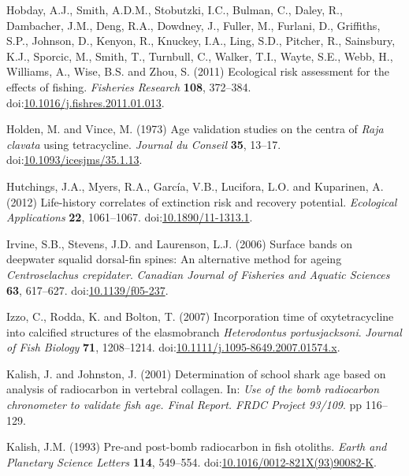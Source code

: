 \documentclass[]{article}
\begin{document}
\hypertarget{ref-hobday_ecological_2011}{}
Hobday, A.J., Smith, A.D.M., Stobutzki, I.C., Bulman, C., Daley, R.,
Dambacher, J.M., Deng, R.A., Dowdney, J., Fuller, M., Furlani, D.,
Griffiths, S.P., Johnson, D., Kenyon, R., Knuckey, I.A., Ling, S.D.,
Pitcher, R., Sainsbury, K.J., Sporcic, M., Smith, T., Turnbull, C.,
Walker, T.I., Wayte, S.E., Webb, H., Williams, A., Wise, B.S. and Zhou,
S. (2011) Ecological risk assessment for the effects of fishing.
\emph{Fisheries Research} \textbf{108}, 372--384.
doi:\href{https://doi.org/10.1016/j.fishres.2011.01.013}{10.1016/j.fishres.2011.01.013}.

\hypertarget{ref-holden_age_1973}{}
Holden, M. and Vince, M. (1973) Age validation studies on the centra of
\emph{Raja clavata} using tetracycline. \emph{Journal du Conseil}
\textbf{35}, 13--17.
doi:\href{https://doi.org/10.1093/icesjms/35.1.13}{10.1093/icesjms/35.1.13}.

\hypertarget{ref-hutchings_life-history_2012}{}
Hutchings, J.A., Myers, R.A., García, V.B., Lucifora, L.O. and
Kuparinen, A. (2012) Life-history correlates of extinction risk and
recovery potential. \emph{Ecological Applications} \textbf{22},
1061--1067.
doi:\href{https://doi.org/10.1890/11-1313.1}{10.1890/11-1313.1}.

\hypertarget{ref-irvine_surface_2006}{}
Irvine, S.B., Stevens, J.D. and Laurenson, L.J. (2006) Surface bands on
deepwater squalid dorsal-fin spines: An alternative method for ageing
\emph{Centroselachus crepidater}. \emph{Canadian Journal of Fisheries
and Aquatic Sciences} \textbf{63}, 617--627.
doi:\href{https://doi.org/10.1139/f05-237}{10.1139/f05-237}.

\hypertarget{ref-izzo_incorporation_2007}{}
Izzo, C., Rodda, K. and Bolton, T. (2007) Incorporation time of
oxytetracycline into calcified structures of the elasmobranch
\emph{Heterodontus portusjacksoni}. \emph{Journal of Fish Biology}
\textbf{71}, 1208--1214.
doi:\href{https://doi.org/10.1111/j.1095-8649.2007.01574.x}{10.1111/j.1095-8649.2007.01574.x}.

\hypertarget{ref-kalish_determination_2001}{}
Kalish, J. and Johnston, J. (2001) Determination of school shark age
based on analysis of radiocarbon in vertebral collagen. In: \emph{Use of
the bomb radiocarbon chronometer to validate fish age. Final Report.
FRDC Project 93/109}. pp 116--129.

\hypertarget{ref-kalish_pre-and_1993}{}
Kalish, J.M. (1993) Pre-and post-bomb radiocarbon in fish otoliths.
\emph{Earth and Planetary Science Letters} \textbf{114}, 549--554.
doi:\href{https://doi.org/10.1016/0012-821X(93)90082-K}{10.1016/0012-821X(93)90082-K}.
\end{document}
